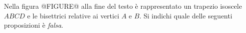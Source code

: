 Nella figura @FIGURE@ alla fine del testo
è rappresentato un trapezio isoscele $ABCD$ e le 
bisettrici relative ai vertici $A$ e $B$.
Si indichi quale delle seguenti proposizioni è \emph{falsa}.